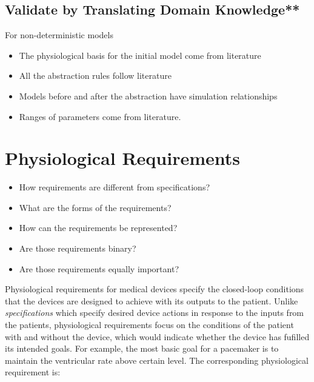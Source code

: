 \documentclass[openany]{now} %
\begin{document}
\section{Validate by Translating Domain Knowledge**}
For non-deterministic models
\begin{itemize}
	\item The physiological basis for the initial model come from literature
    \item All the abstraction rules follow literature
    \item Models before and after the abstraction have simulation relationships
    \item Ranges of parameters come from literature.
\end{itemize}

 
\chapter{Physiological Requirements}
\begin{itemize}
	\item How requirements are different from specifications?
    \item What are the forms of the requirements?
    \item How can the requirements be represented?
    \item Are those requirements binary?
    \item Are those requirements equally important?
\end{itemize}

Physiological requirements for medical devices specify the closed-loop conditions that the devices are designed to achieve with its outputs to the patient. Unlike \emph{specifications} which specify desired device actions in response to the inputs from the patients, physiological requirements focus on the conditions of the patient with and without the device, which would indicate whether the device has fufilled its intended goals. For example, the most basic goal for a pacemaker is to maintain the ventricular rate above certain level. The corresponding physiological requirement is:
\end{document}
